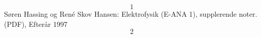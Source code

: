 
\[1\] Søren Hassing og René Skov Hansen: Elektrofysik (E-ANA 1), supplerende noter.(PDF), Efterår 1997\\
\[2\] 
